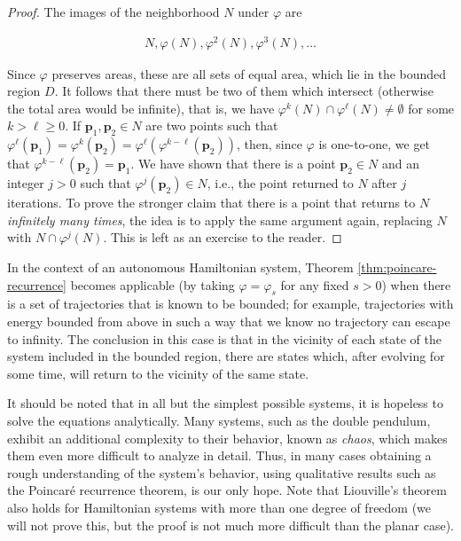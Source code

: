 \documentclass[11pt]{report}
\theoremstyle{plain}
\theoremstyle{definition}
\begin{document}
\begin{proof}
The images of the neighborhood $N$ under $\varphi$
are

\begin{align*}
N, \varphi(N), \varphi^2(N), \varphi^3(N), \ldots
\end{align*}

Since $\varphi$ preserves areas, these are all sets
of equal area, which lie in the bounded region $D$.
It follows that there must be two of them which
intersect (otherwise the total area would be
infinite), that is, we have
$\varphi^k(N) \cap \varphi^\ell(N) \neq \emptyset$
for some $k>\ell\ge 0$. If
$\mathbf{p}_1, \mathbf{p}_2 \in N$ are two points
such that
$\varphi^\ell(\mathbf{p}_1)=\varphi^k(\mathbf{p}_2)=\varphi^\ell(\varphi^{k-\ell}(\mathbf{p}_2))$,
then, since $\varphi$ is one-to-one, we get that
$\varphi^{k-\ell}(\mathbf{p}_2)=\mathbf{p}_1$. We
have shown that there is a point $\mathbf{p}_2\in N$
and an integer $j>0$ such that
$\varphi^j(\mathbf{p}_2)\in N$, i.e., the point
returned to $N$ after $j$ iterations. To prove the
stronger claim that there is a point that returns to
$N$ \emph{infinitely many times}, the idea is to apply the
same argument again, replacing $N$ with
$N\cap \varphi^j(N)$. This is left as an exercise to
the reader.
\end{proof}

In the context of an autonomous Hamiltonian system,
Theorem \ref{thm:poincare-recurrence} becomes applicable
(by taking $\varphi=\varphi_s$ for any fixed $s>0$)
when there is a set of trajectories that is known to
be bounded; for example, trajectories with energy
bounded from above in such a way that we know no
trajectory can escape to infinity. The conclusion in
this case is that in the vicinity of each state of the
system included in the bounded region, there are
states which, after evolving for some time, will
return to the vicinity of the same state.

It should be noted that in all but the simplest
possible systems, it is hopeless to solve the
equations analytically. Many systems, such as the
double pendulum, exhibit an additional complexity to
their behavior, known as \emph{chaos}, which makes them
even more difficult to analyze in detail. Thus, in
many cases obtaining a rough understanding of the
system's behavior, using qualitative results such as
the Poincaré recurrence theorem, is our only hope.
Note that Liouville's theorem also holds for
Hamiltonian systems with more than one degree of
freedom (we will not prove this, but the proof is not
much more difficult than the planar case).
\end{document}
